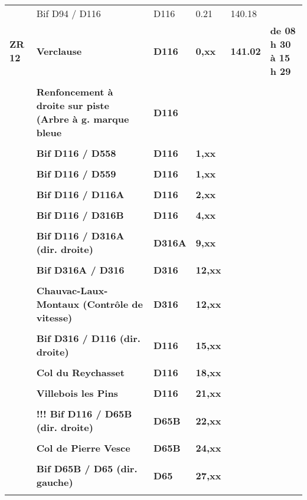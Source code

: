 \documentclass{article}%
\begin{document}
\begin{longtable}{p{2.25cm}|p{6.7cm}|p{2.0cm}|p{1.5cm}|p{1.5cm}|p{3.5cm}}
 &Bif D94 / D116 &D116&0.21&140.18& \\%
\textbf{ZR 12      }&\textbf{Verclause }&\textbf{D116}&\textbf{0,xx}&\textbf{141.02}&\textbf{de 08 h 30 à 15 h 29}\\%
 & & & & & \\%
 &\textbf{Renfoncement à droite sur piste (Arbre à g. marque bleue}&\textbf{D116}& & & \\%
 & & & & & \\%
 &\textbf{Bif D116 / D558 }&\textbf{D116}&\textbf{1,xx}& & \\%
 & & & & & \\%
 &\textbf{Bif D116 / D559 }&\textbf{D116 }&\textbf{1,xx}& & \\%
 & & & & & \\%
 &\textbf{Bif D116 / D116A}&\textbf{D116}&\textbf{2,xx}& & \\%
 & & & & & \\%
 &\textbf{Bif D116 / D316B}&\textbf{D116}&\textbf{4,xx}& & \\%
 & & & & & \\%
 &\textbf{Bif D116 / D316A (dir. droite)}&\textbf{D316A}&\textbf{9,xx}& & \\%
 & & & & & \\%
 &\textbf{Bif D316A / D316 }&\textbf{D316}&\textbf{12,xx}& & \\%
 & & & & & \\%
 &\textbf{Chauvac-Laux-Montaux (Contrôle de vitesse)}&\textbf{D316}&\textbf{12,xx}& & \\%
 & & & & & \\%
 &\textbf{Bif D316 / D116 (dir. droite)}&\textbf{D116}&\textbf{15,xx}& & \\%
 & & & & & \\%
 &\textbf{Col du Reychasset}&\textbf{D116}&\textbf{18,xx}& & \\%
 & & & & & \\%
 &\textbf{Villebois les Pins}&\textbf{D116}&\textbf{21,xx}& & \\%
 & & & & & \\%
 &\textbf{!!! Bif D116 / D65B (dir. droite)}&\textbf{D65B}&\textbf{22,xx}& & \\%
 & & & & & \\%
 &\textbf{Col de Pierre Vesce}&\textbf{D65B}&\textbf{24,xx}& & \\%
 & & & & & \\%
 &\textbf{Bif D65B / D65 (dir. gauche)}&\textbf{D65}&\textbf{27,xx}& & \\%
 & & & & & \\%

\end{longtable}
\end{document}
